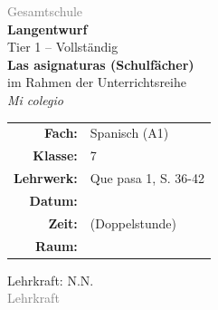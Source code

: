 \documentclass[11pt,a4paper]{article}
\newcommand{\fach}{Spanisch}
\newcommand{\jahrgangsstufe}{7}
\newcommand{\schulart}{Gesamtschule}
\newcommand{\stundenthema}{Las asignaturas (Schulfächer)}
\newcommand{\reihenthema}{Mi colegio}
\newcommand{\lehrkraft}{N.N.}
\newcommand{\ausbildungsstand}{Lehrkraft}
\newcommand{\gerniveau}{A1}
\newcommand{\lehrwerk}{Que pasa 1}
\newcommand{\lehrwerkseite}{S. 36-42}
\begin{document}
\begin{titlepage}
    \centering
    \vspace*{2cm}

    {\large\textcolor{gray}{\schulart}}\\[2cm]

    {\Huge\textcolor{fach}{\textbf{Langentwurf}}}\\[0.5cm]
    {\large Tier 1 -- Vollständig}\\[2cm]

    {\LARGE\textbf{\stundenthema}}\\[0.5cm]
    {\large im Rahmen der Unterrichtsreihe}\\[0.3cm]
    {\Large\textit{\reihenthema}}\\[2cm]

    \begin{tabular}{rl}
        \textbf{Fach:} & \fach{} (\gerniveau) \\[0.3cm]
        \textbf{Klasse:} & \jahrgangsstufe \\[0.3cm]
        \textbf{Lehrwerk:} & \lehrwerk, \lehrwerkseite \\[0.3cm]
        \textbf{Datum:} & \underline{\hspace{3cm}} \\[0.3cm]
        \textbf{Zeit:} & \underline{\hspace{3cm}} (Doppelstunde) \\[0.3cm]
        \textbf{Raum:} & \underline{\hspace{3cm}} \\[0.3cm]
    \end{tabular}

    \vfill

    {\large Lehrkraft: \lehrkraft}\\[0.3cm]
    {\normalsize\textcolor{gray}{\ausbildungsstand}}\\[1cm]

\end{titlepage}

\tableofcontents
\newpage

\end{document}

